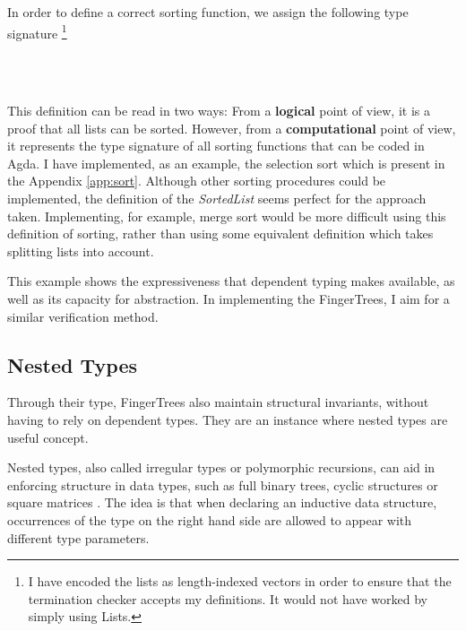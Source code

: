 \documentclass[12pt,twoside,notitlepage]{report}
\begin{document}
In order to define a correct sorting function, we assign the following type signature \footnote{I have encoded the lists as length-indexed vectors in order to ensure that the termination checker accepts my definitions. It would not have worked by simply using Lists.}

\begin{code}
\\
\>[0]\<[2]%
\>[2] \AgdaSymbol{:}  \AgdaSymbol{\{} \AgdaSymbol{:} \AgdaSymbol{\}}  \AgdaSymbol{(} \AgdaSymbol{:}   \AgdaSymbol{)}  \AgdaSymbol{(} \AgdaSymbol{)}\<%
\\
\end{code}

This definition can be read in two ways: From a \textbf{logical} point of view, it is a proof that all lists can be sorted. However, from a \textbf{computational} point of view, it represents the type signature of all sorting functions that can be coded in Agda. I have implemented, as an example, the selection sort which is present in the Appendix \ref{app:sort}. Although other sorting procedures could be implemented, the definition of the \textit{SortedList} seems perfect for the approach taken. Implementing, for example, merge sort would be more difficult using this definition of sorting, rather than using some equivalent definition which takes splitting lists into account.

This example shows the expressiveness that dependent typing makes available, as well as its capacity for abstraction. In implementing the FingerTrees, I aim for a similar verification method.

\subsection{Nested Types}

Through their type, FingerTrees also maintain structural invariants, without having to rely on dependent types. They are an instance where nested types are useful concept. 

Nested types\cite{nested}, also called irregular types or polymorphic recursions, can aid in enforcing structure in data types, such as full binary trees, cyclic structures \cite{cyclic} or square matrices \cite{matrix}. The idea is that when declaring an inductive data structure, occurrences of the type on the right hand side are allowed to appear with different type parameters.
\end{document}
